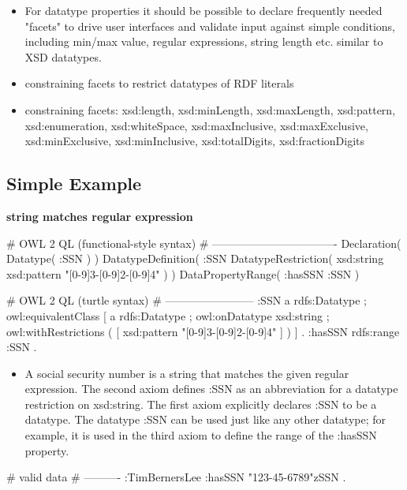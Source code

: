 \documentclass{llncs}
\begin{document}
\begin{itemize}
  \item For datatype properties it should be possible to declare frequently needed "facets" to drive user interfaces and validate input against simple conditions, including min/max value, regular expressions, string length etc. similar to XSD datatypes. 
	\item constraining facets to restrict datatypes of RDF literals
  \item constraining facets: xsd:length, xsd:minLength, xsd:maxLength, xsd:pattern, xsd:enumeration, xsd:whiteSpace, xsd:maxInclusive, xsd:maxExclusive, xsd:minExclusive, xsd:minInclusive, xsd:totalDigits, xsd:fractionDigits

\end{itemize}

\subsection{Simple Example}

\textbf{string matches regular expression}

\begin{ex}
# OWL 2 QL (functional-style syntax)
# ----------------------------------
Declaration( Datatype( :SSN ) ) 
DatatypeDefinition( 
    :SSN
    DatatypeRestriction( xsd:string xsd:pattern "[0-9]{3}-[0-9]{2}-[0-9]{4}" ) )     
DataPropertyRange( :hasSSN :SSN ) 
\end{ex}

\begin{ex}
# OWL 2 QL (turtle syntax)
# ------------------------
:SSN 
    a rdfs:Datatype ;
    owl:equivalentClass [
        a rdfs:Datatype ;
        owl:onDatatype xsd:string ;
        owl:withRestrictions ( 
            [ xsd:pattern "[0-9]{3}-[0-9]{2}-[0-9]{4}" ] ) ] .
:hasSSN rdfs:range :SSN .
\end{ex}

\begin{itemize}
	\item A social security number is a string that matches the given regular expression. 
The second axiom defines :SSN as an abbreviation for a datatype restriction on xsd:string. 
The first axiom explicitly declares :SSN to be a datatype. 
The datatype :SSN can be used just like any other datatype; 
for example, it is used in the third axiom to define the range of the :hasSSN property. 
\end{itemize}

\begin{ex}
# valid data
# ----------
:TimBernersLee
    :hasSSN "123-45-6789"^^:SSN .
\end{ex}
\end{document}
